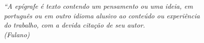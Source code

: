 \begin{epigrafe}
    \vspace*{\fill}
	\begin{flushright}
		\textit{``A epígrafe é texto contendo um pensamento ou uma ideia, em\\ português ou em outro idioma alusivo ao conteúdo ou experiência \\ do trabalho, com a devida citação de seu autor.\\
		(Fulano)}
	\end{flushright}
\end{epigrafe}